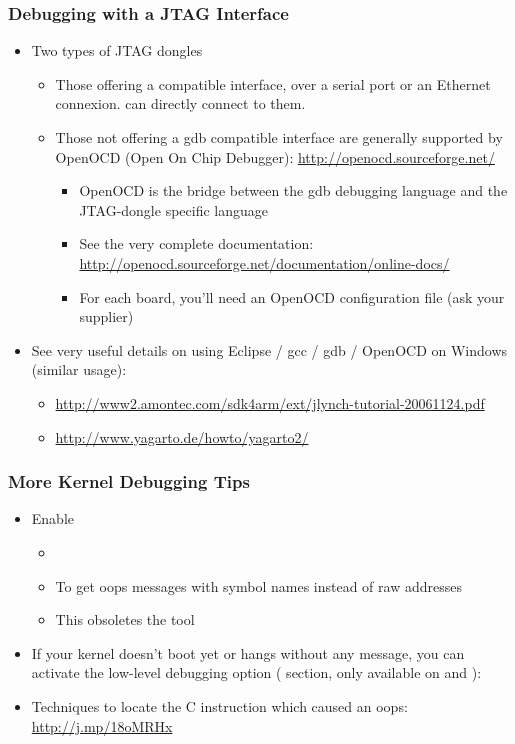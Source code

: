 \begin{frame}
  \frametitle{Debugging with a JTAG Interface}
  \begin{itemize}
  \item Two types of JTAG dongles
    \begin{itemize}
    \item Those offering a  compatible interface, over a
      serial port or an Ethernet connexion.  can directly
      connect to them. \item Those not offering a gdb compatible interface are generally
      supported by OpenOCD (Open On Chip Debugger):
      \url{http://openocd.sourceforge.net/}
      \begin{itemize}
      \item OpenOCD is the bridge between the gdb debugging language
        and the JTAG-dongle specific language
      \item See the very complete documentation:
        \url{http://openocd.sourceforge.net/documentation/online-docs/}
      \item For each board, you'll need an OpenOCD configuration file
        (ask your supplier)
      \end{itemize}
    \end{itemize}
  \item See very useful details on using Eclipse / gcc / gdb / OpenOCD
    on Windows (similar usage):
    \begin{itemize}
    \item \url{http://www2.amontec.com/sdk4arm/ext/jlynch-tutorial-20061124.pdf}
    \item \url{http://www.yagarto.de/howto/yagarto2/}
    \end{itemize}
  \end{itemize}
\end{frame}

\begin{frame}
  \frametitle{More Kernel Debugging Tips}
  \begin{itemize}
  \item Enable 
    \begin{itemize}
    \item {}
    \item To get oops messages with symbol names instead of raw addresses
    \item This obsoletes the  tool
    \end{itemize}
  \item If your kernel doesn't boot yet or hangs without any message,
    you can activate the low-level debugging option
    ( section, only available on  and
    ): 
  \item Techniques to locate the C instruction which caused an oops:
    \url{http://j.mp/18oMRHx}
  \end{itemize}
\end{frame}

